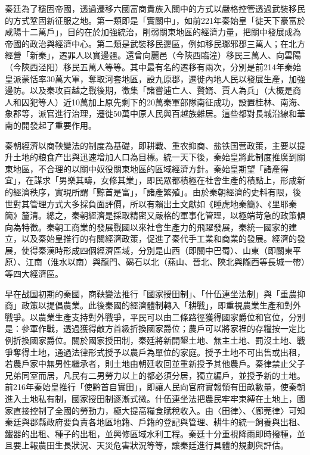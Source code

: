 秦廷為了穩固帝國，透過遷移六國富商貴族入關中的方式以嚴格控管透過武裝移民的方式鞏固新征服之地。第一類即是「實關中」，如前221年秦始皇「徙天下豪富於咸陽十二萬戶」，目的在於加強統治，削弱關東地區的經濟力量，把關中發展成為帝國的政治與經濟中心。第二類是武裝移民邊區，例如移民瑯邪郡三萬人；在北方經營「新秦」，遷罪人以實邊疆。還曾向麗邑（今陝西臨潼）移民三萬人、向雲陽（今陝西泾阳）移民五萬人等等。其中最有名的遷移有兩次，分別是前214年秦始皇派蒙恬率30萬大軍，奪取河套地區，設九原郡，遷徙內地人民以發展生產，加強邊防。以及秦攻百越之戰後期，徵集「諸嘗逋亡人、贅婿、賈人為兵」（大概是商人和囚犯等人）近10萬加上原先剩下的20萬秦軍部隊南征成功，設置桂林、南海、象郡等，派官進行治理，遷徙50萬中原人民與百越族雜居。這些都對長城沿線和華南的開發起了重要作用。

秦朝經濟以商鞅變法的制度為基礎，即耕戰、重农抑商、盐铁国营政策，主要以提升土地的粮食产出與迅速增加人口為目標。統一天下後，秦始皇將此制度推廣到關東地區，不合理的以關中奴役關東地區的區域經濟方針。秦始皇期望「諸產得宜」，在謀求「男樂其疇，女修其業」，即民眾都積極在社會生產的積點上，形成新的經濟秩序，實現所謂「黥首是富」，「諸產繁殖」。由於秦朝經濟的史料有限，後世對其管理方式大多採負面評價，所以有賴出土文獻如《睡虎地秦簡》、《里耶秦簡》釐清。總之，秦朝經濟是採取精密又嚴格的軍事化管理，以極端苛急的政策傾向為特徵。秦朝工商業的發展戰國以來社會生產力的飛躍發展，秦統一國家的建立，以及秦始皇推行的有關經濟政策，促進了秦代手工業和商業的發展。經濟的發展，使得秦漢時形成四個經濟區域，分別是山西（即關中巴蜀）、山東（即關東平原）、江南（淮水以南）與龍門、碣石以北（燕山、晉北、陝北與隴西等長城一帶）等四大經濟區。

早在战国初期的秦國，商鞅變法推行「國家授田制」、「什伍連坐法制」與「重農抑商」政策以提倡農業。此後秦國的經濟體制轉入「耕戰」，即重視農業生產和對外戰爭。以農業生產支持對外戰爭，平民可以由二條路徑獲得國家爵位和官位，分別是：參軍作戰，透過獲得敵方首級折換國家爵位；農戶可以將家裡的存糧按一定比例折換國家爵位。關於國家授田制，秦廷將新開墾土地、無主土地、罰沒土地、戰爭奪得土地，通過法律形式授予以農戶為單位的家庭。授予土地不可出售或出租，若農戶家中無男性繼承者，則土地由朝廷收回並重新授予其他農戶。秦律禁止父子兄弟同室而居，凡民有二男勞力以上的都必須分居，獨立編戶，並授予新的土地。前216年秦始皇推行「使黔首自實田」，即讓人民向官府實報領有田畝數量，使秦朝進入土地私有制，國家授田制逐漸式微。什伍連坐法把農民牢牢束縛在土地上，國家直接控制了全國的勞動力，極大提高糧食賦稅收入。由〈田律〉、〈廊莞律〉可知秦廷與郡縣政府要負責各地區地籍、戶籍的登記與管理、耕牛的統一飼養與出租、鐵器的出租、種子的出租，並興修區域水利工程。秦廷十分重視降雨即時撥種，並且要上報農田生長狀況、天災危害狀況等等，讓秦廷進行具體的規劃與評估。

